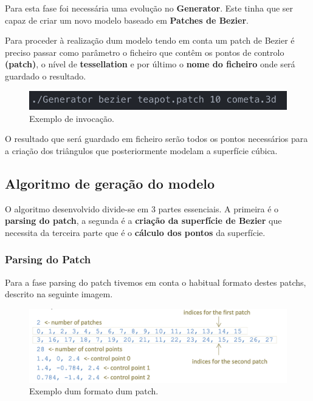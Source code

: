 \documentclass[a4paper]{article}
\begin{document}
Para esta fase foi necessária uma evolução no \textbf{Generator}. Este tinha que ser capaz de criar um novo modelo baseado em \textbf{Patches de Bezier}.

Para proceder à realização dum modelo tendo em conta um patch de Bezier é preciso passar como parâmetro o ficheiro que contêm os pontos de controlo  \textbf{(patch)}, o nível de \textbf{tessellation} e por último o \textbf{nome do ficheiro} onde será guardado o resultado.

\begin{figure}[H]
\centering
\includegraphics[scale=0.75]{bezier_command.png}
\caption{Exemplo de invocação.}
\label{img:bezier_command}
\end{figure}

O resultado que será guardado em ficheiro serão todos os pontos necessários para a criação dos triângulos que posteriormente modelam a superfície cúbica.

\subsection{Algoritmo de geração do modelo}
\label{sec:bezier}

O algoritmo desenvolvido divide-se em 3 partes essenciais. A primeira é o \textbf{parsing do patch}, a segunda é a \textbf{criação da superfície de Bezier} que necessita da terceira parte que é o \textbf{cálculo dos pontos} da superfície.

\subsubsection{Parsing do Patch}

Para a fase parsing do patch tivemos em conta o habitual formato destes patchs, descrito na seguinte imagem.

\begin{figure}[H]
\centering
\includegraphics[scale=0.60]{patch_format.png}
\caption{Exemplo dum formato dum patch.}
\label{img:bezier_command}
\end{figure}
\end{document}
